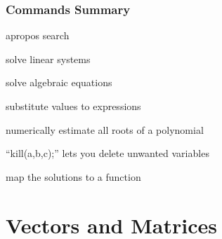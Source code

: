 \documentclass[12pt,usenames,pdftex]{beamer}
\begin{document}
\begin{frame}
{\begin{maxima}
    \end{maxima}
  }
\end{frame}

\begin{frame}
  \frametitle{Commands Summary}
  \begin{description}
  \item<1->[apropos] apropos search
  \item<1->[linsolve] solve linear systems
  \item<1->[solve] solve algebraic equations
  \item<1->[subst] substitute values to expressions
  \item<1->[allroots] numerically estimate all roots of a polynomial
  \item<1->[kill] ``kill(a,b,c);'' lets you delete unwanted variables
  \item<1->[map] map the solutions to a function
  \end{description}
\end{frame}

\section{Vectors and Matrices}
\end{document}
